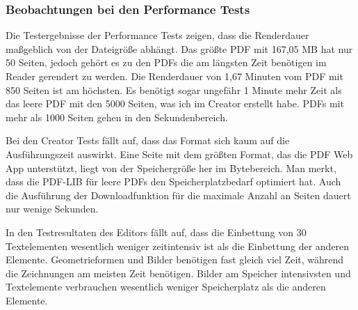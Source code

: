 \subsubsection{Beobachtungen bei den Performance Tests}
Die Testergebnisse der Performance Tests zeigen, dass die Renderdauer maßgeblich von der Dateigröße abhängt. Das größte PDF mit 167,05 MB hat nur 50 Seiten, jedoch gehört es zu den PDFs die am längsten Zeit benötigen im Reader gerendert zu werden. Die Renderdauer von 1,67 Minuten vom PDF mit 850 Seiten ist am höchsten. Es benötigt sogar ungefähr 1 Minute mehr Zeit als das leere PDF mit den 5000 Seiten, was ich im Creator erstellt habe. PDFs mit mehr als 1000 Seiten gehen in den Sekundenbereich.
\par 
Bei den Creator Tests fällt auf, dass das Format sich kaum auf die Ausführungszeit auswirkt. Eine Seite mit dem größten Format, das die PDF Web App unterstützt, liegt von der Speichergröße her im Bytebereich. Man merkt, dass die PDF-LIB für leere PDFs den Speicherplatzbedarf optimiert hat. Auch die Ausführung der Downloadfunktion für die maximale Anzahl an Seiten dauert nur wenige Sekunden. 
\par
In den Testresultaten des Editors fällt auf, dass die Einbettung von 30 Textelementen wesentlich weniger zeitintensiv ist als die Einbettung der anderen Elemente. Geometrieformen und Bilder benötigen fast gleich viel Zeit, während die Zeichnungen am meisten Zeit benötigen. Bilder am Speicher intensivsten und Textelemente verbrauchen wesentlich weniger Speicherplatz als die anderen Elemente.  

